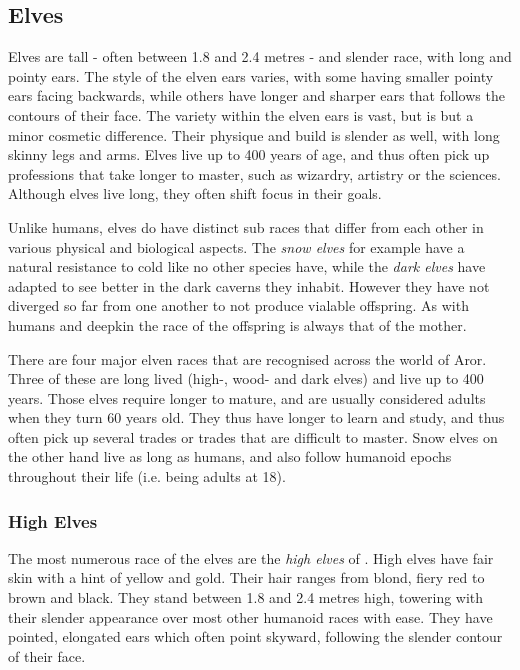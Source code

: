 \subsection{Elves}
\label{sec:Elves}

Elves are tall - often between 1.8 and 2.4 metres - and slender race, with
long and pointy ears. The style of the elven ears varies, with some having
smaller pointy ears facing backwards, while others have longer and sharper
ears that follows the contours of their face. The variety within the elven
ears is vast, but is but a minor cosmetic difference. Their physique and build
is slender as well, with long skinny legs and arms. Elves live up to 400 years
of age, and thus often pick up professions that take longer to master, such as
wizardry, artistry or the sciences. Although elves live long, they often shift
focus in their goals.

Unlike humans, elves do have distinct sub races that differ from each other in
various physical and biological aspects. The \emph{snow elves} for example
have a natural resistance to cold like no other species have, while the
\emph{dark elves} have adapted to see better in the dark caverns they
inhabit. However they have not diverged so far from one another to not produce
vialable offspring. As with humans and deepkin the race of the offspring is
always that of the mother.

There are four major elven races that are recognised across the world of Aror.
Three of these are long lived (high-, wood- and dark elves) and live up to 400
years. Those elves require longer to mature, and are usually considered adults
when they turn 60 years old. They thus have longer to learn and study, and
thus often pick up several trades or trades that are difficult to master.
Snow elves on the other hand live as long as humans, and also follow humanoid
epochs throughout their life (i.e. being adults at 18).

\subsubsection{High Elves}
\label{sec:High Elves}

The most numerous race of the elves are the \emph{high elves} of
. High elves have fair skin with a hint of yellow and
gold. Their hair ranges from blond, fiery red to brown and black. They stand
between 1.8 and 2.4 metres high, towering with their slender appearance over
most other humanoid races with ease. They have pointed, elongated ears which
often point skyward, following the slender contour of their face.

